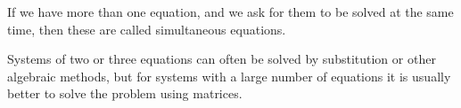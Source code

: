If we have more than one equation, and we ask for them to be solved at the same time,
then these are called simultaneous equations.
\par
Systems of two or three equations can often be solved by substitution
or other algebraic methods, but for systems with a large number of equations
it is usually better to solve the problem using matrices.